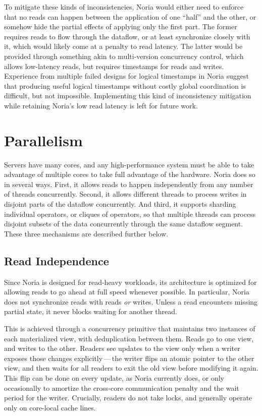 To mitigate these kinds of inconsistencies, Noria would either need to enforce
that no reads can happen between the application of one ``half'' and the other,
or somehow hide the partial effects of applying only the first part. The former
requires reads to flow through the dataflow, or at least synchronize closely
with it, which would likely come at a penalty to read latency. The latter would
be provided through something akin to multi-version concurrency control, which
allows low-latency reads, but requires timestamps for reads and writes.
Experience from multiple failed designs for logical timestamps in Noria suggest
that producing useful logical timestamps without costly global coordination is
difficult, but not impossible. Implementing this kind of inconsistency
mitigation while retaining Noria's low read latency is left for future work.

\section{Parallelism}

Servers have many cores, and any high-performance system must be able to take
advantage of multiple cores to take full advantage of the hardware. Noria does
so in several ways. First, it allows reads to happen independently from any
number of threads concurrently. Second, it allows different threads to process
writes in disjoint parts of the dataflow concurrently. And third, it supports
sharding individual operators, or cliques of operators, so that multiple threads
can process disjoint subsets of the data concurrently through the same dataflow
segment. These three mechanisms are described further below.

\subsection{Read Independence}

Since Noria is designed for read-heavy workloads, its architecture is optimized
for allowing reads to go ahead at full speed whenever possible. In particular,
Noria does not synchronize reads with reads \emph{or} writes. Unless a read
encounters missing partial state, it never blocks waiting for another thread.

This is achieved through a concurrency primitive that maintains two instances of
each materialized view, with deduplication between them. Reads go to one view,
and writes to the other. Readers see updates to the view only when a writer
exposes those changes explicitly\,---\,the writer flips an atomic pointer to the
other view, and then waits for all readers to exit the old view before modifying
it again. This flip can be done on every update, as Noria currently does, or
only occasionally to amortize the cross-core communication penalty and the wait
period for the writer. Crucially, readers do not take locks, and generally
operate only on core-local cache lines.

